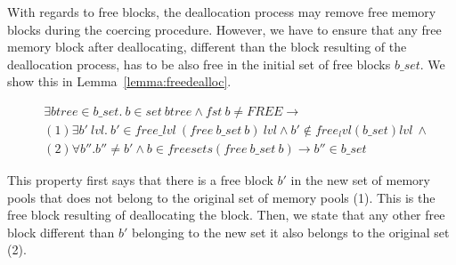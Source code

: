 With regards to free blocks, the deallocation process may remove free memory blocks during the coercing procedure. However, we have to ensure that any free memory block after deallocating, different than the block resulting of the deallocation process, has to be also free in the initial set of free blocks $b\_set$. We show this in Lemma~\ref{lemma:freedealloc}.

\begin{lemma} 
	\label{lemma:freedealloc}
\end{lemma}
\vspace{-7pt}
{\footnotesize
	\begin{align*}
	&\exists btree \in b\_set.\ b \in set\ btree \wedge fst\ b \neq FREE \longrightarrow \\ 
	&(1) \exists b'\ lvl.\ b' \in free\_lvl\ (free\ b\_set\ b)\ lvl \wedge b' \notin free_lvl (b\_set) lvl\ \wedge \\
	& (2) \forall b''. b''\neq b' \wedge b \in freesets (free\ b\_set\ b) \longrightarrow b'' \in b\_set
	\end{align*}
}
\vspace{-12pt}

This property first says that there is a free block $b'$ in the new set of memory pools that does not belong to the original set of memory pools (1). This is the free block resulting of deallocating the block. Then, we state that any other free block different than $b'$ belonging to the new set it also belongs to the original set (2).

%

